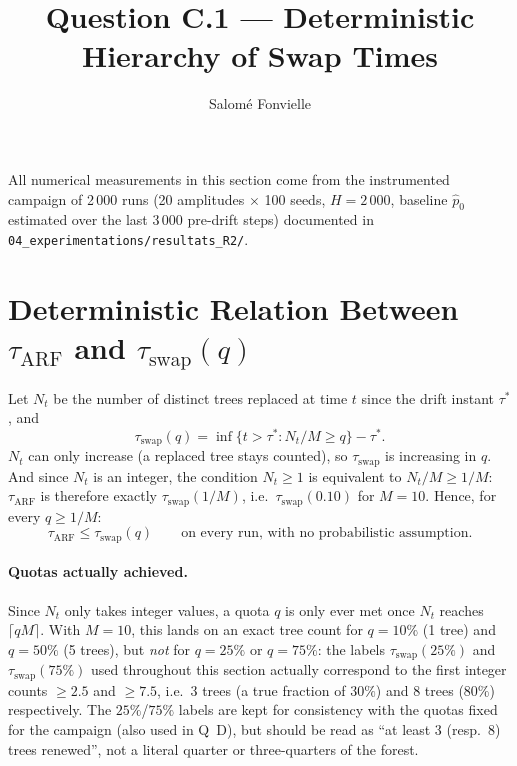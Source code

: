 \documentclass[11pt,a4paper]{article}
\title{Question C.1 --- Deterministic Hierarchy of Swap Times}
\author{Salomé Fonvielle}
\date{}
\begin{document}
\maketitle

\noindent All numerical measurements in this section come from the instrumented
campaign of 2\,000 runs (20 amplitudes $\times$ 100 seeds, $H=2\,000$, baseline
$\hat p_0$ estimated over the last 3\,000 pre-drift steps) documented in
\texttt{04\_experimentations/resultats\_R2/}.

\section{Deterministic Relation Between $\tau_{\mathrm{ARF}}$ and $\tau_{\mathrm{swap}}(q)$}

Let $N_t$ be the number of distinct trees replaced at time $t$ since the drift
instant $\tau^*$, and
\[
  \tau_{\mathrm{swap}}(q) = \inf\{t > \tau^* : N_t/M \ge q\} - \tau^*.
\]
$N_t$ can only increase (a replaced tree stays counted), so $\tau_{\mathrm{swap}}$ is
increasing in $q$. And since $N_t$ is an integer, the condition $N_t \ge 1$ is
equivalent to $N_t/M \ge 1/M$: $\tau_{\mathrm{ARF}}$ is therefore exactly
$\tau_{\mathrm{swap}}(1/M)$, i.e.\ $\tau_{\mathrm{swap}}(0.10)$ for $M=10$. Hence, for
every $q \ge 1/M$:
\begin{equation}
  \boxed{\tau_{\mathrm{ARF}} \le \tau_{\mathrm{swap}}(q)} \qquad \text{on every run,
  with no probabilistic assumption.}
  \label{eq:relation}
\end{equation}

\paragraph{Quotas actually achieved.} Since $N_t$ only takes integer values, a quota
$q$ is only ever met once $N_t$ reaches $\lceil qM \rceil$. With $M=10$, this lands on
an exact tree count for $q=10\%$ (1 tree) and $q=50\%$ (5 trees), but \emph{not} for
$q=25\%$ or $q=75\%$: the labels $\tau_{\mathrm{swap}}(25\%)$ and
$\tau_{\mathrm{swap}}(75\%)$ used throughout this section actually correspond to the
first integer counts $\ge 2.5$ and $\ge 7.5$, i.e.\ $3$ trees (a true fraction of
$30\%$) and $8$ trees ($80\%$) respectively. The $25\%$/$75\%$ labels are kept for
consistency with the quotas fixed for the campaign (also used in Q~D), but should
be read as ``at least 3 (resp.\ 8) trees renewed'', not a literal quarter or
three-quarters of the forest.
\end{document}
